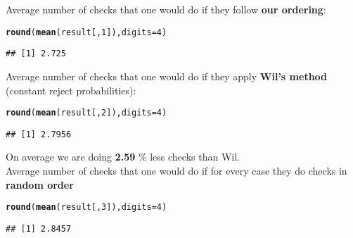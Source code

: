 \documentclass{article}\usepackage[]{graphicx}\usepackage[]{color}
\makeatletter
\newcommand{\hlnum}[1]{\textcolor[rgb]{0.686,0.059,0.569}{#1}}%
\newcommand{\hlstd}[1]{\textcolor[rgb]{0.345,0.345,0.345}{#1}}%
\newcommand{\hlkwc}[1]{\textcolor[rgb]{0.333,0.667,0.333}{#1}}%
\newcommand{\hlkwd}[1]{\textcolor[rgb]{0.737,0.353,0.396}{\textbf{#1}}}%
\newenvironment{kframe}{%
 \def\at@end@of@kframe{}%
 \ifinner\ifhmode%
  \def\at@end@of@kframe{\end{minipage}}%
  \begin{minipage}{\columnwidth}%
 \fi\fi%
 \def\FrameCommand##1{\hskip\@totalleftmargin \hskip-\fboxsep
 \colorbox{shadecolor}{##1}\hskip-\fboxsep
     \hskip-\linewidth \hskip-\@totalleftmargin \hskip\columnwidth}%
 \MakeFramed {\advance\hsize-\width
   \@totalleftmargin\z@ \linewidth\hsize
   \@setminipage}}%
 {\par\unskip\endMakeFramed%
 \at@end@of@kframe}
\newenvironment{knitrout}{}{} %
\makeatother
\begin{document}
Average number of checks that one would do if they follow \textbf{our ordering}:

\begin{knitrout}
\color{fgcolor}\begin{kframe}
\begin{alltt}
\hlkwd{round}\hlstd{(}\hlkwd{mean}\hlstd{(result[,}\hlnum{1}\hlstd{]),}\hlkwc{digits} \hlstd{=} \hlnum{4}\hlstd{)}
\end{alltt}
\begin{verbatim}
## [1] 2.725
\end{verbatim}
\end{kframe}
\end{knitrout}

Average number of checks that one would do if they apply \textbf{Wil's method} (constant reject probabilities):

\begin{knitrout}
\color{fgcolor}\begin{kframe}
\begin{alltt}
\hlkwd{round}\hlstd{(}\hlkwd{mean}\hlstd{(result[,}\hlnum{2}\hlstd{]),}\hlkwc{digits} \hlstd{=} \hlnum{4}\hlstd{)}
\end{alltt}
\begin{verbatim}
## [1] 2.7956
\end{verbatim}
\end{kframe}
\end{knitrout}


 
On average we are doing \textbf{2.59} \% less checks than Wil. \\

Average number of checks that one would do if for every case they do checks in \textbf{random order}

\begin{knitrout}
\color{fgcolor}\begin{kframe}
\begin{alltt}
\hlkwd{round}\hlstd{(}\hlkwd{mean}\hlstd{(result[,}\hlnum{3}\hlstd{]),}\hlkwc{digits} \hlstd{=} \hlnum{4}\hlstd{)}
\end{alltt}
\begin{verbatim}
## [1] 2.8457
\end{verbatim}
\end{kframe}
\end{knitrout}
\end{document}
